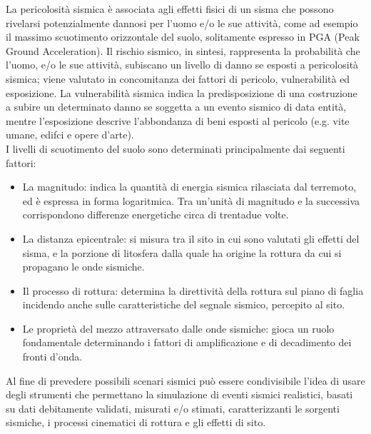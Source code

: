 \documentclass[a4paper,12pt,titlepage]{article}
\begin{document}
La pericolosità sismica è associata agli effetti fisici di un sisma che possono rivelarsi potenzialmente dannosi per l'uomo e/o le sue attività, come ad
esempio il massimo scuotimento orizzontale del suolo, solitamente espresso in PGA (Peak Ground Acceleration). Il rischio sismico, in sintesi, rappresenta
la probabilità che l'uomo, e/o le sue attività, subiscano un livello di danno se esposti a pericolosità sismica; viene valutato in concomitanza dei fattori di
pericolo, vulnerabilità ed esposizione. La vulnerabilità sismica indica la predisposizione di una costruzione a subire un determinato danno se soggetta a
un evento sismico di data entità, mentre l'esposizione descrive l'abbondanza di beni esposti al pericolo (e.g. vite umane, edifci e opere d'arte).\\
I livelli di scuotimento del suolo sono determinati principalmente dai seguenti fattori:\\

\begin{itemize}
\item  La magnitudo: indica la quantità di energia sismica rilasciata dal terremoto, ed è espressa in forma logaritmica. Tra un'unità di magnitudo e la
successiva corrispondono differenze energetiche circa di trentadue volte.
\item  La distanza epicentrale: si misura tra il sito in cui sono valutati gli effetti del sisma, e la porzione di litosfera dalla quale ha origine la rottura da cui si propagano le onde sismiche.
\item  Il processo di rottura: determina la direttività della rottura sul piano di faglia incidendo anche sulle caratteristiche del segnale sismico, percepito al sito.
\item  Le proprietà del mezzo attraversato dalle onde sismiche: gioca un ruolo fondamentale determinando i fattori di amplificazione e di decadimento
dei fronti d'onda.
\end{itemize}

Al fine di prevedere possibili scenari sismici può essere condivisibile l'idea di usare degli strumenti che permettano la simulazione di eventi sismici
realistici, basati su dati debitamente validati, misurati e/o stimati, caratterizzanti le sorgenti sismiche, i processi cinematici di rottura e gli effetti di sito.\\
\end{document}
